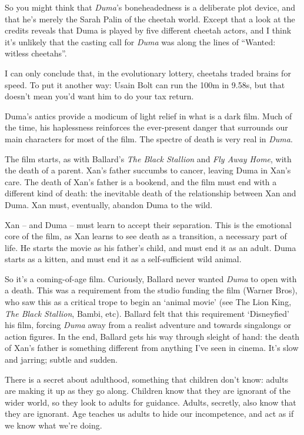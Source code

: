 So you might think that \textit{Duma}'s boneheadedness is a deliberate plot device, and that he's merely the Sarah Palin of the cheetah world. Except that a look at the credits reveals that Duma is played by five different cheetah actors, and I think it's unlikely that the casting call for \textit{Duma} was along the lines of ``Wanted: witless cheetahs''.

I can only conclude that, in the evolutionary lottery, cheetahs traded brains for speed. To put it another way: Usain Bolt can run the 100m in 9.58s, but that doesn't mean you'd want him to do your tax return.

Duma's antics provide a modicum of light relief in what is a dark film. Much of the time, his haplessness reinforces the ever-present danger that surrounds our main characters for most of the film. The spectre of death is very real in \textit{Duma}.

The film starts, as with Ballard's \textit{The Black Stallion} and \textit{Fly Away Home}, with the death of a parent. Xan's father succumbs to cancer, leaving Duma in Xan's care. The death of Xan's father is a bookend, and the film must end with a different kind of death: the inevitable death of the relationship between Xan and Duma. Xan must, eventually, abandon Duma to the wild.

Xan -- and Duma -- must learn to accept their separation. This is the emotional core of the film, as Xan learns to see death as a transition, a necessary part of life. He starts the movie as his father's child, and must end it as an adult. Duma starts as a kitten, and must end it as a self-sufficient wild animal.

So it's a coming-of-age film. Curiously, Ballard never wanted \textit{Duma} to open with a death. This was a requirement from the studio funding the film (Warner Bros), who saw this as a critical trope to begin an `animal movie' (see The Lion King, \textit{The Black Stallion}, Bambi, etc). Ballard felt that this requirement `Disneyfied' his film, forcing \textit{Duma} away from a realist adventure and towards singalongs or action figures. In the end, Ballard gets his way through sleight of hand: the death of Xan's father is something different from anything I've seen in cinema. It's slow and jarring; subtle and sudden.

There is a secret about adulthood, something that children don't know: adults are making it up as they go along. Children know that they are ignorant of the wider world, so they look to adults for guidance. Adults, secretly, also know that they are ignorant. Age teaches us adults to hide our incompetence, and act as if we know what we're doing.

